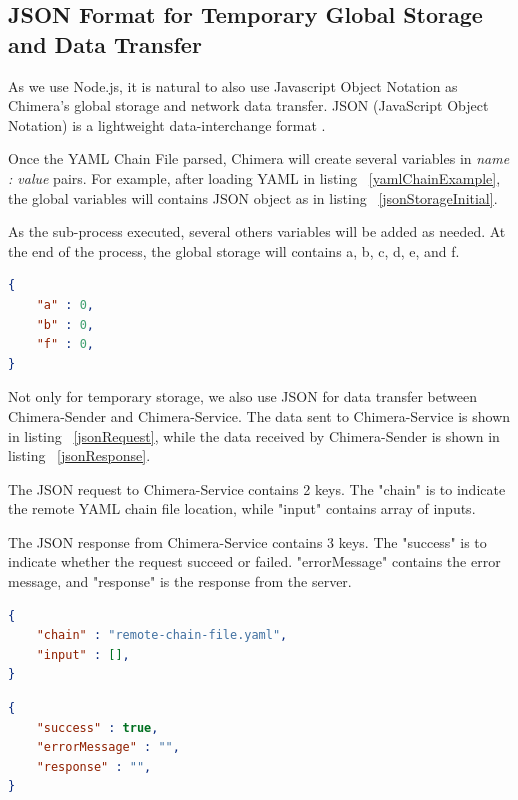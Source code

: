\documentclass[conference]{IEEEtran}
\begin{document}
\subsection{JSON Format for Temporary Global Storage and Data Transfer}

As we use Node.js, it is natural to also use Javascript Object Notation as Chimera's
global storage and network data transfer. JSON (JavaScript Object Notation) is a 
lightweight data-interchange format \cite{json}.

Once the YAML Chain File parsed, Chimera will create several variables in {\it name : 
value} pairs. For example, after loading YAML in listing ~\ref{yamlChainExample}, the
global variables will contains JSON object as in listing ~\ref{jsonStorageInitial}.

As the sub-process executed, several others variables will be added as needed. At the
end of the process, the global storage will contains a, b, c, d, e, and f.

\begin{lstlisting}[caption=Initial content of JSON Storage, label=jsonStorageInitial, language=json, basicstyle=\small, breaklines=true]
{
    "a" : 0,
    "b" : 0,
    "f" : 0,
}
\end{lstlisting}

Not only for temporary storage, we also use JSON for data transfer between 
Chimera-Sender and Chimera-Service. The data sent to Chimera-Service is shown in listing
~\ref{jsonRequest}, while the data received by Chimera-Sender is shown in listing
~\ref{jsonResponse}.

The JSON request to Chimera-Service contains 2 keys. The "chain" is to 
indicate the remote YAML chain file location, while "input" contains array of inputs.

The JSON response from Chimera-Service contains 3 keys. The "success" is to indicate
whether the request succeed or failed. "errorMessage" contains the error message, and
"response" is the response from the server.

\begin{lstlisting}[caption=JSON Request, label=jsonRequest, language=json, basicstyle=\small, breaklines=true] 
{
    "chain" : "remote-chain-file.yaml",
    "input" : [],
}
\end{lstlisting}

\begin{lstlisting}[caption=JSON Response, label=jsonResponse, language=json, basicstyle=\small, breaklines=true]
{
    "success" : true,
    "errorMessage" : "",
    "response" : "",
}
\end{lstlisting}
\end{document}
